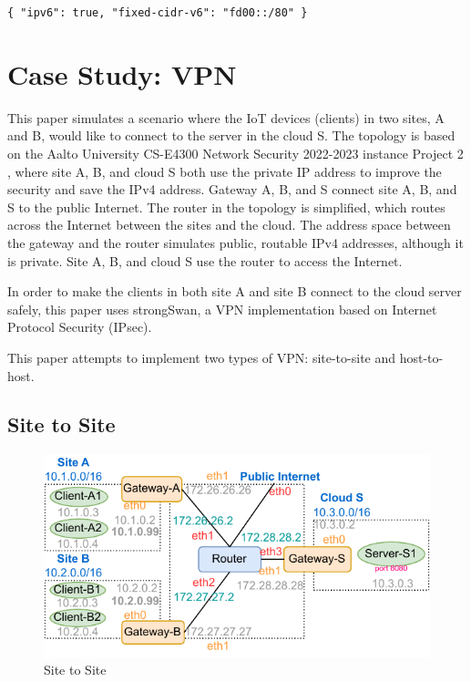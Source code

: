 \documentclass[article]{aaltoseries}
\begin{document}
\texttt{\{
  "ipv6": true,
  "fixed-cidr-v6": "fd00::/80"
\}}



\section{Case Study: VPN}

This paper simulates a scenario where the IoT devices (clients) in two sites, A and B, would like to connect to the server in the cloud S. The topology is based on the Aalto University CS-E4300 Network Security 2022-2023 instance Project 2 \cite{aura_peltonen_bui_2022}, where site A, B, and cloud S both use the private IP address to improve the security and save the IPv4 address. Gateway A, B, and S connect site A, B, and S to the public Internet. The router in the topology is simplified, which routes across the Internet between the sites and the cloud. The address space between the gateway and the router simulates public, routable IPv4 addresses, although it is private. Site A, B, and cloud S use the router to access the Internet.

In order to make the clients in both site A and site B connect to the cloud server safely, this paper uses strongSwan, a VPN implementation based on Internet Protocol Security (IPsec).

This paper attempts to implement two types of VPN: site-to-site and host-to-host.

\subsection{Site to Site}
\begin{figure}[t!]
  \begin{center}
    \includegraphics[width=1.1\textwidth]{figures/site-to-site.pdf}
    \caption{Site to Site}
    \label{fig:site2site}
  \end{center}
\end{figure}
\end{document}
